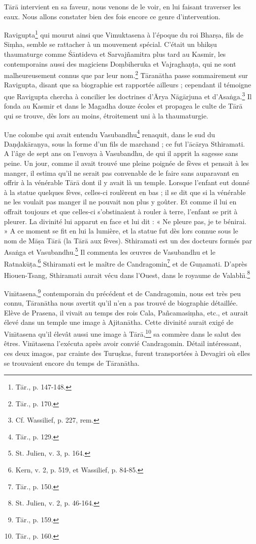 \documentclass[a4paper, 11pt, oneside, french, landscape, twocolumn]{article}
\begin{document}
T\={a}r\={a} intervient en sa faveur, nous venons de le voir, en lui faisant traverser les eaux. Nous allons constater bien des fois encore ce genre d'intervention.

Ravigupta\footnote{T\={a}r., p. 147-148.} qui mourut ainsi que Vimuktasena à l'époque du roi Bhar\d{s}a, fils de Si\d{m}ha, semble se rattacher à un mouvement spécial. C'était un bhik\d{s}u thaumaturge comme \'{S}\={a}ntideva et Sarvaj\~{n}amitra plus tard au Kasmir, les contemporains aussi des magiciens Do\d{m}biheruka et Vajragha\d{n}\d{t}a, qui ne sont malheureusement connus que par leur nom.\footnote{T\={a}r., p. 170.} T\={a}ran\={a}tha passe sommairement sur Ravigupta, disant que sa biographie est rapportée ailleurs ; cependant il témoigne que Ravigupta chercha à concilier les doctrines d'\={A}rya N\={a}g\={a}rjuna et d'Asa\.{n}ga.\footnote{Cf. Wassilief, p. 227, rem.} Il fonda au Kasmir et dans le Magadha douze écoles et propagea le culte de T\={a}r\={a} qui se trouve, dès lors au moins, étroitement uni à la thaumaturgie.

Une colombe qui avait entendu Vasubandhu\footnote{T\={a}r., p. 129.} renaquit, dans le sud du Da\d{n}\d{d}ak\={a}ra\d{n}ya, sous la forme d'un fils de marchand ; ce fut l'\={a}c\={a}rya Sthiramati. A l'âge de sept ans on l'envoya à Vasubandhu, de qui il apprit la sagesse sans peine. Un jour, comme il avait trouvé une pleine poignée de fèves et pensait à les manger, il estima qu'il ne serait pas convenable de le faire sans auparavant en offrir à la vénérable T\={a}r\={a} dont il y avait là un temple. Lorsque l'enfant eut donné à la statue quelques fèves, celles-ci roulèrent en bas ; il se dit que si la vénérable ne les voulait pas manger il ne pouvait non plus y goûter. Et comme il lui en offrait toujours et que celles-ci s'obstinaient à rouler à terre, l'enfant se prit à pleurer. La divinité lui apparut en face et lui dit : « Ne pleure pas, je te bénirai. » A ce moment se fit en lui la lumière, et la statue fut dès lors connue sous le nom de M\={a}\d{s}a T\={a}r\={a} (la T\={a}r\={a} aux fèves). Sthiramati est un des docteurs formés par Asa\.{n}ga et Vasubandhu.\footnote{St. Julien, v. 3, p. 164.} Il commenta les œuvres de Vasubandhu et le Ratnak\={u}\d{t}a.\footnote{Kern, v. 2, p. 519, et Wassilief, p. 84-85.} Sthiramati est le maître de Candragomin\footnote{T\={a}r., p. 150.} et de Gu\d{n}amati. D'après Hiouen-Tsang, Sthiramati aurait vécu dans l'Ouest, dans le royaume de Valabh\={\i}.\footnote{St. Julien, v. 2, p. 46-164.}

Vin\={\i}tasena,\footnote{T\={a}r., p. 159.} contemporain du précédent et de Candragomin, nous est très peu connu, T\={a}ran\={a}tha nous avertit qu'il n'en a pas trouvé de biographie détaillée. Elève de Prasena, il vivait au temps des rois Cala, Pa\~{n}camasi\d{m}ha, etc., et aurait élevé dans un temple une image à Ajitan\={a}tha. Cette divinité aurait exigé de Vin\={\i}tasena qu'il élevât aussi une image à T\={a}r\={a},\footnote{T\={a}r., p. 160.} sa commère dans le salut des êtres. Vin\={\i}tasena l'exécuta après avoir convié Candragomin. Détail intéressant, ces deux imagos, par crainte des Turu\d{s}kas, furent transportées à Devagiri où elles se trouvaient encore du temps de T\={a}ran\={a}tha.
\end{document}
